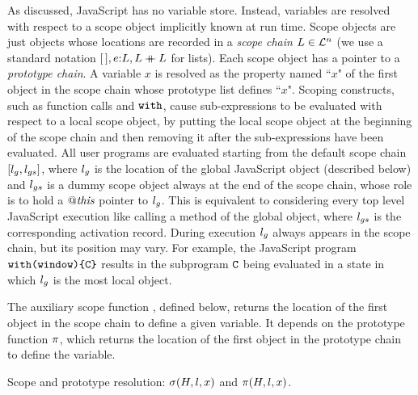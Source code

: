 \documentclass{article}
\begin{document}
%
As discussed, JavaScript has no variable store. 
Instead, variables are resolved with respect to a scope object implicitly known at run time.
Scope objects are just objects whose locations are recorded in a \emph{scope chain} $L\in \mathcal{L}^n$ (we use a standard notation
$[\,],e{:} L,L\mathbin{+\mkern-10mu+} L$ for lists). 
% 
%
%
Each scope object has a pointer to a {\em prototype chain}. 
A variable $x$ is resolved as the property named ``$x$" of the first object in the scope chain 
whose prototype list defines ``$x$".
%
Scoping constructs, such as function calls and $\mbox{\texttt{{\upshape with}}}$, 
cause sub-expressions to be evaluated with respect to a local scope object, by  putting the local scope object  at the beginning of the scope chain and then removing it after the sub-expressions have been evaluated. 
%
All user programs are evaluated starting from the default scope chain
$[l_g,l_{gs}]$, where $l_g$ is the location of the global JavaScript
object (described below) and $l_{gs}$ is a dummy scope object always at the end of the scope chain, whose 
role is to hold a $\mathit{@this}$ pointer to $l_g$. This is equivalent to considering every top level JavaScript execution like calling a method of the global object, where $l_{gs}$ is the corresponding activation record. 
During execution $l_g$ always appears in the scope chain, but its position may vary.
For example, the JavaScript program $\mbox{\texttt{{\upshape with(window)\{C\}}}}$ results in
the subprogram $\mbox{\texttt{{\upshape C}}}$ being evaluated in a state in which $l_g$ is the most local object.


%
The auxiliary scope  function \scope,  defined below, returns the location of the first object in
the scope chain to define a given variable. It depends on the prototype function $\pi$, which 
returns the location of the first object in
the prototype chain to define the variable.


%
\begin{display}{Scope and prototype resolution: $\sigma(H,l,x)$ and $\pi(H,l,x)$.}
\\[\gap]
\rsep
{}\\
\\
\\[\gap]
\rsep
{}
\end{display}
\end{document}
